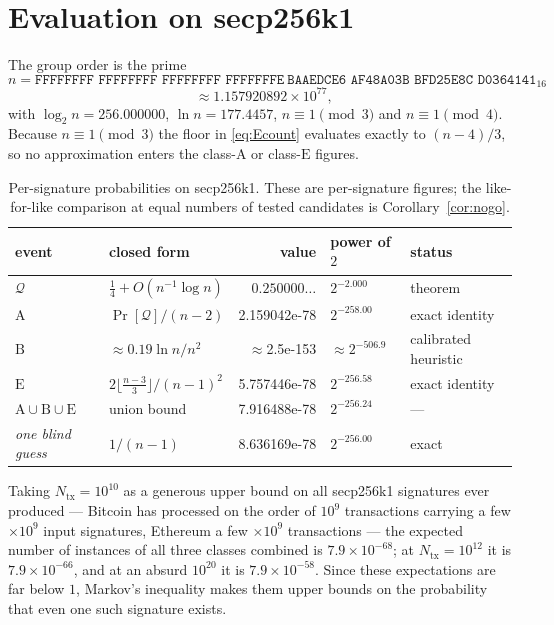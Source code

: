 \documentclass[11pt,a4paper]{article}
\theoremstyle{plain}
\theoremstyle{definition}
\theoremstyle{remark}
\newcommand{\Qu}{\mathcal{Q}}
\newcommand{\Pro}{\Pr}
\newcommand{\clA}{\mathrm{A}}
\newcommand{\clB}{\mathrm{B}}
\newcommand{\clE}{\mathrm{E}}
\begin{document}
\section{Evaluation on secp256k1}\label{sec:secp}

The group order is the prime
\[
  n = \texttt{FFFFFFFF FFFFFFFF FFFFFFFF FFFFFFFE}\ \texttt{BAAEDCE6 AF48A03B BFD25E8C D0364141}_{16}
\]
\[
  \phantom{n}\approx 1.157920892\times10^{77},
\]
with $\log_2 n = 256.000000$, $\ln n = 177.4457$, $n \equiv 1 \pmod 3$ and $n \equiv 1 \pmod 4$.
Because $n \equiv 1 \pmod 3$ the floor in \eqref{eq:Ecount} evaluates exactly to $(n-4)/3$, so no
approximation enters the class-$\clA$ or class-$\clE$ figures.

\begin{table}[t]
\centering\small
\begin{tabular}{llrll}
\toprule
event & closed form & value & power of $2$ & status\\
\midrule
$\Qu$ & $\tfrac14 + O(n^{-1}\log n)$ & $0.250000\ldots$ & $2^{-2.000}$ & theorem\\
$\clA$ & $\Pro[\Qu]/(n-2)$ & 2.159042e{-}78 & $2^{-258.00}$ & exact identity\\
$\clB$ & $\approx 0.19\ln n/n^{2}$ & $\approx$2.5e{-}153 & $\approx 2^{-506.9}$ & calibrated heuristic\\
$\clE$ & $2\lfloor\frac{n-3}{3}\rfloor/(n-1)^{2}$ & 5.757446e{-}78 & $2^{-256.58}$ & exact identity\\
$\clA\cup\clB\cup\clE$ & union bound & 7.916488e{-}78 & $2^{-256.24}$ & ---\\
\emph{one blind guess} & $1/(n-1)$ & 8.636169e{-}78 & $2^{-256.00}$ & exact\\
\bottomrule
\end{tabular}
\caption{Per-signature probabilities on secp256k1. These are per-signature figures; the
like-for-like comparison at equal numbers of tested candidates is Corollary~\ref{cor:nogo}.}
\label{tab:secp}
\end{table}

Taking $N_{\mathrm{tx}} = 10^{10}$ as a generous upper bound on all secp256k1 signatures ever
produced --- Bitcoin has processed on the order of $10^{9}$ transactions carrying a few
$\times 10^{9}$ input signatures, Ethereum a few $\times10^{9}$ transactions --- the expected
number of instances of all three classes combined is $7.9\times10^{-68}$; at $N_{\mathrm{tx}} =
10^{12}$ it is $7.9\times10^{-66}$, and at an absurd $10^{20}$ it is $7.9\times10^{-58}$. Since
these expectations are far below $1$, Markov's inequality makes them upper bounds on the
probability that even one such signature exists.
\end{document}
